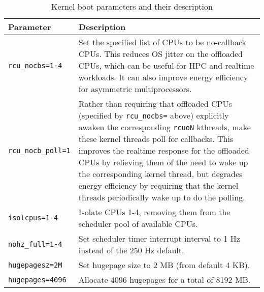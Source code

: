 \begin{table}
    \centering
    \caption{Kernel boot parameters and their description}
    \label{tab:kernel_params_table}
\begin{tabular}{|l|p{10cm}|}
    \hline
    Parameter & Description \\
    \hline \hline
    \texttt{rcu\_nocbs=1-4} & Set the specified list of CPUs to be no-callback CPUs. This reduces OS jitter on the offloaded CPUs, which can be useful for HPC and realtime workloads. It can also improve energy efficiency for asymmetric multiprocessors. \\ 
    \hline
    \texttt{rcu\_nocb\_poll=1} & Rather than requiring that offloaded CPUs (specified by \texttt{rcu\_nocbs=} above) explicitly awaken the corresponding \texttt{rcuoN} kthreads, make these kernel threads poll for callbacks. This improves the realtime response for the offloaded CPUs by relieving them of the need to wake up the corresponding kernel thread, but degrades energy efficiency by requiring that the kernel threads periodically wake up to do the polling. \\
    \hline
    \texttt{isolcpus=1-4} & Isolate CPUs 1-4, removing them from the scheduler pool of available CPUs. \\ 
    \hline
    \texttt{nohz\_full=1-4} & Set scheduler timer interrupt interval to 1 Hz instead of the 250 Hz default. \\ 
    \hline
    \texttt{hugepagesz=2M} & Set hugepage size to 2 MB (from default 4 KB). \\
    \hline
    \texttt{hugepages=4096} & Allocate 4096 hugepages for a total of 8192 MB. \\ 
    \hline
\end{tabular}
\end{table}
